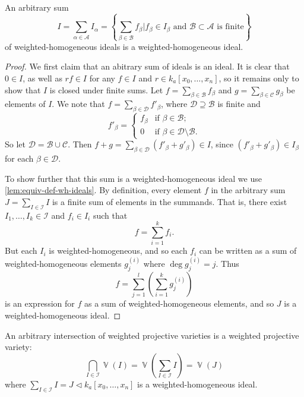 \documentclass[10pt,notitlepage]{article}
\numberwithin{equation}{subsection}
\DeclareMathOperator{\van}{\mathbb{V}}
\newcommand{\kazn}{k_a[x_0,\ldots,x_n]}
\begin{document}
    \begin{lemma}
        An arbitrary sum
        \[
            I = \sum_{\alpha\in\mathcal{A}}I_\alpha = \left\{\sum_{\beta\in\mathcal{B}}f_\beta \bigg\rvert f_\beta\in I_\beta\text{ and } \mathcal{B}\subset\mathcal{A}\text{ is finite}\right\}
        \]
        of weighted-homogeneous ideals is a weighted-homogeneous ideal.
    \end{lemma}
    
    \begin{proof}
        We first claim that an abitrary sum of ideals is an ideal.
        It is clear that $0\in I$, as well as $rf\in I$ for any $f\in I$ and $r\in\kazn$, so it remains only to show that $I$ is closed under finite sums.
        Let $f = \sum_{\beta\in\mathcal{B}}f_\beta$ and $g = \sum_{\beta\in\mathcal{C}}g_\beta$ be elements of $I$.
        We note that $f=\sum_{\beta\in\mathcal{D}}f'_\beta$, where $\mathcal{D}\supseteq\mathcal{B}$ is finite and
        \[
            f'_\beta =
            \begin{cases}
                f_\beta & \text{if }\beta\in\mathcal{B} ; \\
                0 & \text{if }\beta\in\mathcal{D}\setminus\mathcal{B} .
            \end{cases}
        \]
        So let $\mathcal{D}=\mathcal{B}\cup\mathcal{C}$.
        Then $f+g = \sum_{\beta\in\mathcal{D}}(f'_\beta+g'_\beta)\in I$, since $(f'_\beta+g'_\beta)\in I_\beta$ for each $\beta\in\mathcal{D}$.
        
        To show further that this sum is a weighted-homogeneous ideal we use \cref{lem:equiv-def-wh-ideals}.
        By definition, every element $f$ in the arbitrary sum $J=\sum_{I\in\mathcal{I}}I$ is a finite sum of elements in the summands.
        That is, there exist $I_1,\ldots,I_k\in\mathcal{I}$ and $f_i\in I_i$ such that
        \[f = \sum_{i=1}^k f_i.\]
        But each $I_i$ is weighted-homogeneous, and so each $f_i$ can be written as a sum of weighted-homogeneous elements $g_j^{(i)}$ where $\deg g_j^{(i)}=j$.
        Thus
        \[f = \sum_{j=1}^l\left(\sum_{i=1}^k g_j^{(i)}\right)\]
        is an expression for $f$ as a sum of weighted-homogeneous elements, and so $J$ is a weighted-homogeneous ideal.
    \end{proof}

    \begin{corollary}\label{cor:topology-well-defined-2}
        An arbitrary intersection of weighted projective varieties is a weighted projective variety:
        \[\bigcap_{I\in\mathcal{I}}\van(I)=\van\left(\sum_{I\in\mathcal{I}}I\right)=\van(J)\]
        where $\sum_{I\in\mathcal{I}}I=J\triangleleft\kazn$ is a weighted-homogeneous ideal.
    \end{corollary}
\end{document}
